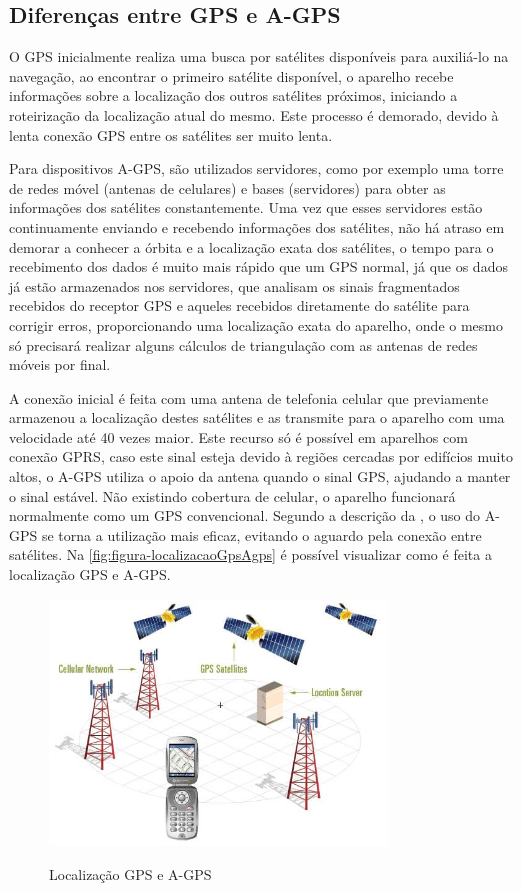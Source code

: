 \subsection{Diferenças entre GPS e A-GPS}
O GPS inicialmente realiza uma busca por satélites disponíveis para auxiliá-lo na navegação, ao encontrar o primeiro satélite disponível, o aparelho recebe informações sobre a localização dos outros satélites próximos, iniciando a roteirização da localização atual do mesmo. Este processo é demorado, devido à lenta conexão GPS entre os satélites ser muito lenta.

Para dispositivos A-GPS, são utilizados servidores, como por exemplo uma torre de redes móvel (antenas de celulares) e bases (servidores) para obter as informações dos satélites constantemente. Uma vez que esses servidores estão continuamente enviando e recebendo informações dos satélites, não há atraso em demorar a conhecer a órbita e a localização exata dos satélites, o tempo para o recebimento dos dados é muito mais rápido que um GPS normal, já que os dados já estão armazenados nos servidores, que analisam os sinais fragmentados recebidos do receptor GPS e aqueles recebidos diretamente do satélite para corrigir erros, proporcionando uma localização exata do aparelho, onde o mesmo só precisará realizar alguns cálculos de triangulação com as antenas de redes móveis por final.

A conexão inicial é feita com uma antena de telefonia celular que previamente armazenou a localização destes satélites e as transmite para o aparelho com uma velocidade até 40 vezes maior. Este recurso só é possível em aparelhos com conexão GPRS, caso este sinal esteja devido à regiões cercadas por edifícios muito altos, o A-GPS utiliza o apoio da antena quando o sinal GPS, ajudando a manter o sinal estável. Não existindo cobertura de celular, o aparelho funcionará normalmente como um GPS convencional. Segundo a descrição da , o uso do A-GPS se torna a utilização mais eficaz, evitando o aguardo pela conexão entre satélites. Na \autoref{fig:figura-localizacaoGpsAgps} é possível visualizar como é feita a localização GPS e A-GPS.

\begin{figure}[H]
    \centering
    \caption{Localização GPS e A-GPS}
    \includegraphics[width=0.8\textwidth]{./dados/figuras/fig5}
    \label{fig:figura-localizacaoGpsAgps}
\end{figure}

